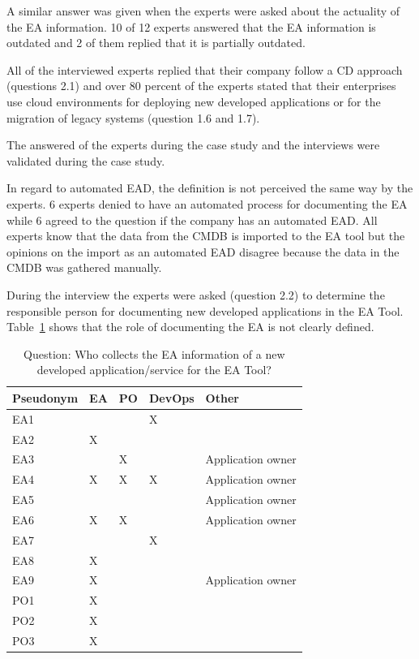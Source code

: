 A similar answer was given when the experts were asked about the actuality of the EA information. 10 of 12 experts answered that the EA information is outdated and 2 of them replied that it is partially outdated.

All of the interviewed experts replied that their company follow a CD approach (questions 2.1) and over 80 percent of the experts stated that their enterprises use cloud environments for deploying new developed applications or for the migration of legacy systems (question 1.6 and 1.7).

The answered of the experts during the case study and the interviews were validated during the case study.

In regard to automated EAD, the definition is not perceived the same way by the experts. 6 experts denied to have an automated process for documenting the EA while 6 agreed to the question if the company has an automated EAD. All experts know that the data from the CMDB is imported to the EA tool but the opinions on the import as an automated EAD disagree because the data in the CMDB was gathered manually. 

During the interview the experts were asked (question 2.2) to determine the responsible person for documenting new developed applications in the EA Tool. Table~\ref{tab:eadresposible} shows that the role of documenting the EA is not clearly defined.
\begin{table}[htpb]
  \caption[Question: Who collects the EA information of a new developed application/service for the EA Tool?]{Question: Who collects the EA information of a new developed application/service for the EA Tool?}\label{tab:eadresposible}
  \centering
  \begin{tabular}{l l l l l}
    \toprule
      Pseudonym & EA & PO & DevOps & Other\\
    \midrule
      EA1 &  & & X &\\ %
      EA2 & X & & &\\ %
      EA3 & & X & & Application owner\\ %
      EA4 & X & X & X & Application owner\\ %
      EA5 &  & & & Application owner\\ %
      EA6 & X & X & & Application owner\\ %
      EA7 & & & X & \\ %
      EA8 & X & & & \\%
      EA9 & X & & & Application owner\\%
      PO1 & X & & &\\ %
      PO2 & X & & &\\ %
      PO3 & X & & &\\ %
    \bottomrule
  \end{tabular}
\end{table}

